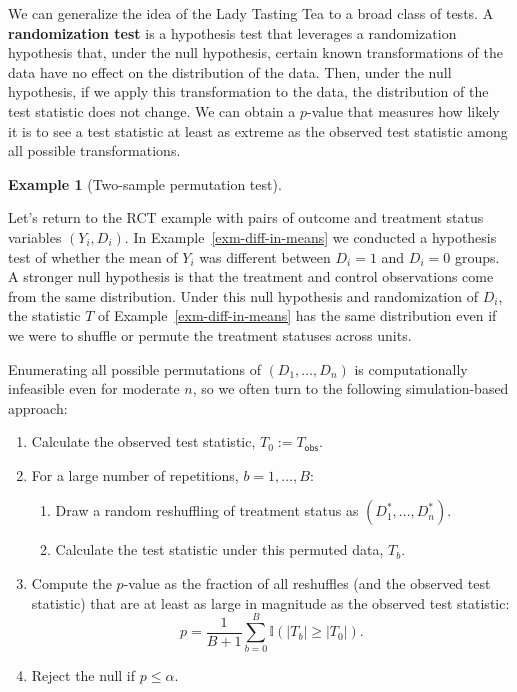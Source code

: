 \documentclass[
  13pt,
  letterpaper,
  DIV=11,
  numbers=noendperiod]{scrreprt}
\providecommand{\tightlist}{%
  \setlength{\itemsep}{0pt}\setlength{\parskip}{0pt}}
\theoremstyle{plain}
\theoremstyle{plain}
\theoremstyle{definition}
\theoremstyle{definition}
\newtheorem{example}{Example}[chapter]
\theoremstyle{remark}
\begin{document}
We can generalize the idea of the Lady Tasting Tea to a broad class of
tests. A \textbf{randomization test} is a hypothesis test that leverages
a randomization hypothesis that, under the null hypothesis, certain
known transformations of the data have no effect on the distribution of
the data. Then, under the null hypothesis, if we apply this
transformation to the data, the distribution of the test statistic does
not change. We can obtain a \(p\)-value that measures how likely it is
to see a test statistic at least as extreme as the observed test
statistic among all possible transformations.

\begin{example}[Two-sample permutation
test]\protect\hypertarget{exm-permutation-test}{}\label{exm-permutation-test}

Let's return to the RCT example with pairs of outcome and treatment
status variables \((Y_i, D_i)\). In Example~\ref{exm-diff-in-means} we
conducted a hypothesis test of whether the mean of \(Y_i\) was different
between \(D_i = 1\) and \(D_i = 0\) groups. A stronger null hypothesis
is that the treatment and control observations come from the same
distribution. Under this null hypothesis and randomization of \(D_i\),
the statistic \(T\) of Example~\ref{exm-diff-in-means} has the same
distribution even if we were to shuffle or permute the treatment
statuses across units.

Enumerating all possible permutations of \((D_1, \ldots, D_n)\) is
computationally infeasible even for moderate \(n\), so we often turn to
the following simulation-based approach:

\begin{enumerate}
\def\labelenumi{\arabic{enumi}.}
\tightlist
\item
  Calculate the observed test statistic, \(T_0:=T_{\textsf{obs}}\).
\item
  For a large number of repetitions, \(b = 1,\ldots, B\):

  \begin{enumerate}
  \def\labelenumii{\alph{enumii}.}
  \tightlist
  \item
    Draw a random reshuffling of treatment status as
    \((D^*_1, \ldots, D^*_n)\).
  \item
    Calculate the test statistic under this permuted data, \(T_b\).
  \end{enumerate}
\item
  Compute the \(p\)-value as the fraction of all reshuffles (and the
  observed test statistic) that are at least as large in magnitude as
  the observed test statistic: \[
  p = \frac{1}{B+1} \sum_{b=0}^B \mathbb{I}(|T_b| \geq |T_0|).
  \]
\item
  Reject the null if \(p \leq \alpha\).
\end{enumerate}


\end{example}
\end{document}
